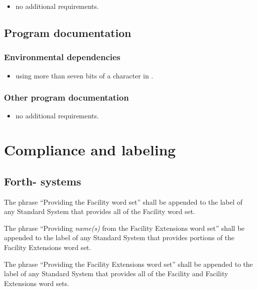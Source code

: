 \begin{itemize}
\item no additional requirements.
\end{itemize}

\subsection{Program documentation} %

\subsubsection{Environmental dependencies} %

\begin{itemize}
\item using more than seven bits of a character in
	.
\end{itemize}

\subsubsection{Other program documentation} %

\begin{itemize}
\item no additional requirements.
\end{itemize}

\section{Compliance and labeling} %

\subsection{Forth-\snapshot{} systems} %

The phrase ``Providing the Facility word set'' shall be appended to
the label of any Standard System that provides all of the Facility
word set.

The phrase ``Providing \emph{name(s)} from the Facility Extensions
word set'' shall be appended to the label of any Standard System
that provides portions of the Facility Extensions word set.

The phrase ``Providing the Facility Extensions word set'' shall be
appended to the label of any Standard System that provides all of
the Facility and Facility Extensions word sets.

